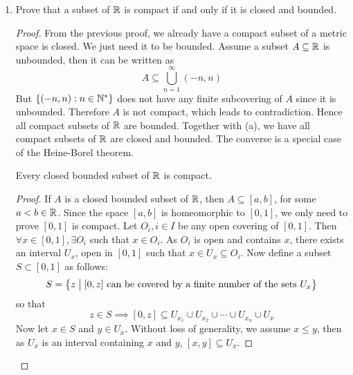\begin{enumerate}
\begin{enumerate}
\begin{proof}
        \begin{align*}
        U&:=U_{a_1}\cup U_{a_2}\cup\cdots\cup U_{a_n}\\
        V&:=V_{a_1}\cap V_{a_2}\cap\cdots\cap V_{a_n}
        \end{align*}
        Then \(p\in V\) and \(V_a\cap U_a=\varnothing\) implies \(V\cap U=\varnothing\), which in turn implies \(V\cap A=\varnothing\).
        So $p$ is not a limit point of $A$, and $V$ is an open set containing $p$ which does not intersect $A$.
        Hence $A$ contains all of its limit points and therefore is closed.
        \end{proof}
    \end{enumerate}
    \item Prove that a subset of $\mathbb{R}$ is compact if and only if it is closed and bounded.
    \begin{proof}
    From the previous proof, we already have a compact subset of a metric space is closed.
    We just need it to be bounded.
    Assume a subset \(A\subseteq\mathbb{R}\) is unbounded, then it can be written as
    \[ A\subseteq \bigcup_{n=1}^\infty (-n,n) \]
    But \(\{(-n,n):n\in\mathbb{N}^*\}\) does not have any finite subcovering of $A$ since it is unbounded.
    Therefore $A$ is not compact, which leads to contradiction.
    Hence all compact subsets of $\mathbb{R}$ are bounded.
    Together with (a), we have all compact subsets of $\mathbb{R}$ are closed and bounded.
    The converse is a special case of the Heine-Borel theorem.
    \begin{theorem}\label{Heine-Borel}
    Every closed bounded subset of $\mathbb{R}$ is compact.
    \end{theorem}
    \begin{proof}
    If $A$ is a closed bounded subset of $\mathbb{R}$, then \(A \subseteq [a,b]\), for some \(a<b\in\mathbb{R}\).
    Since the space \([a,b]\) is homeomorphic to \([0,1]\), we only need to prove \([0,1]\) is compact.
    Let \(O_i,i\in I\) be any open covering of \([0,1]\).
	Then \(\forall x\in[0,1],\exists O_i\) such that \(x\in O_i\).
	As \(O_i\) is open and contains $x$, there exists an interval $U_x$, open in \([0,1]\) such that \(x\in U_x\subseteq O_i\).
	Now define a subset \(S\subset[0,1]\) as follows:
	\[ S=\Set{z}{[0,z]\textrm{ can be covered by a finite number of the sets }U_x} \]
	so that
	\[ z\in S\implies [0,z]\subseteq U_{x_1}\cup U_{x_2}\cup\cdots\cup U_{x_n}\cup U_x \]
	Now let \(x\in S\) and \(y\in U_x\).
	Without loss of generality, we assume \(x\leq y\), then as $U_x$ is an interval containing $x$ and $y$, \([x,y]\subseteq U_x\).

\end{proof}
\end{proof}
\end{enumerate}
